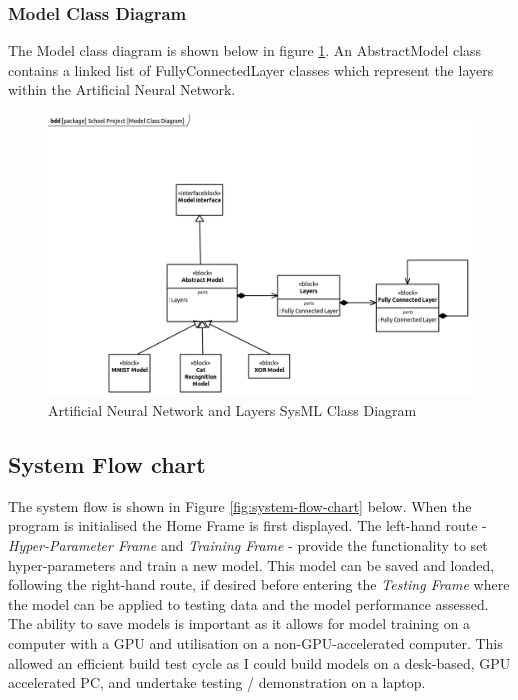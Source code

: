 \documentclass[./project-report/src/latex/project-report.tex]{subfiles}
\begin{document}
\subsubsection{Model Class Diagram}

The Model class diagram is shown below in figure \ref{fig:model-class-diagram}. An AbstractModel class contains a linked list of FullyConnectedLayer classes which represent 
the layers within the Artificial Neural Network.

\begin{figure}[h!]
\centering
\includegraphics[width=1\textwidth]{./project-report/src/images/model-class-diagram.png}
\caption{Artificial Neural Network and Layers SysML Class Diagram}
\label{fig:model-class-diagram}
\end{figure}

\pagebreak

\subsection{System Flow chart}

The system flow is shown in Figure \ref{fig:system-flow-chart} below. When the program is initialised the Home Frame is first displayed. The left-hand route - 
\textit{Hyper-Parameter Frame} and \textit{Training Frame} - provide the functionality to set hyper-parameters and train a new model. This model can be saved and loaded, 
following the right-hand route, if desired before entering the \textit{Testing Frame} where the model can be applied to testing data and the model performance assessed. The 
ability to save models is important as it allows for model training on a computer with a GPU and utilisation on a non-GPU-accelerated computer. This allowed an efficient build test cycle as I could build models on a desk-based, GPU accelerated PC, and undertake testing / demonstration on a laptop.
\end{document}
